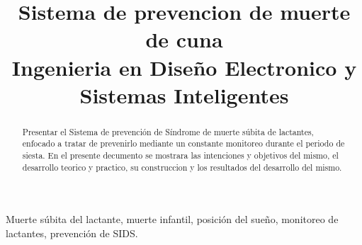 \title{
    Sistema de prevencion de muerte de cuna\\
    \small{Ingenieria en Diseño Electronico y Sistemas Inteligentes}
}
\author{
    \and
    \and
}
\maketitle

%
%
\begin{abstract}

   Presentar el Sistema de prevención de Síndrome de muerte súbita de lactantes, 
   enfocado a tratar de prevenirlo mediante un constante monitoreo durante el periodo de siesta.  
   En el presente decumento se mostrara las intenciones y objetivos del mismo, el desarrollo teorico
   y practico, su construccion y los resultados del desarrollo del mismo.


\end{abstract}
\begin{IEEEkeywords}
    Muerte súbita del lactante, muerte infantil, posición del sueño, monitoreo de lactantes, prevención de SIDS.
\end{IEEEkeywords}

\tableofcontents
